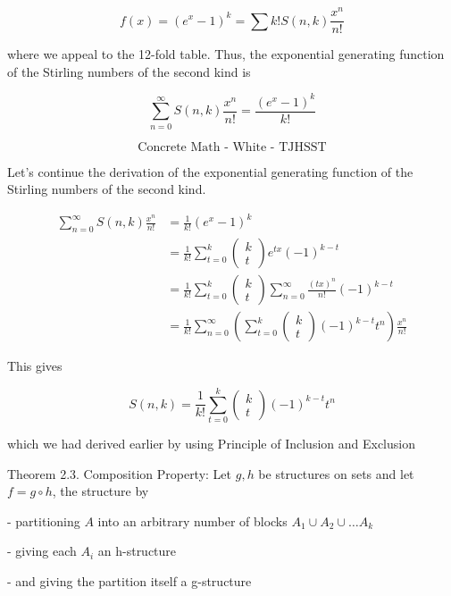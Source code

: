 $$
f(x)=\left(e^{x}-1\right)^{k}=\sum k ! S(n, k) \frac{x^{n}}{n !}
$$

where we appeal to the 12-fold table. Thus, the exponential generating function of the Stirling numbers of the second kind is

$$
\sum_{n=0}^{\infty} S(n, k) \frac{x^{n}}{n !}=\frac{\left(e^{x}-1\right)^{k}}{k !}
$$

$$
\text { Concrete Math - White - TJHSST }
$$

Let's continue the derivation of the exponential generating function of the Stirling numbers of the second kind.

$$
\begin{aligned}
\sum_{n=0}^{\infty} S(n, k) \frac{x^{n}}{n !} & =\frac{1}{k !}\left(e^{x}-1\right)^{k} \\
& =\frac{1}{k !} \sum_{t=0}^{k}\left(\begin{array}{l}
k \\
t
\end{array}\right) e^{t x}(-1)^{k-t} \\
& =\frac{1}{k !} \sum_{t=0}^{k}\left(\begin{array}{l}
k \\
t
\end{array}\right) \sum_{n=0}^{\infty} \frac{(t x)^{n}}{n !}(-1)^{k-t} \\
& =\frac{1}{k !} \sum_{n=0}^{\infty}\left(\sum_{t=0}^{k}\left(\begin{array}{l}
k \\
t
\end{array}\right)(-1)^{k-t} t^{n}\right) \frac{x^{n}}{n !}
\end{aligned}
$$

This gives

$$
S(n, k)=\frac{1}{k !} \sum_{t=0}^{k}\left(\begin{array}{l}
k \\
t
\end{array}\right)(-1)^{k-t} t^{n}
$$

which we had derived earlier by using Principle of Inclusion and Exclusion

Theorem 2.3. Composition Property: Let $g, h$ be structures on sets and let $f=g \circ h$, the structure by

- partitioning $A$ into an arbitrary number of blocks $A_{1} \cup A_{2} \cup \ldots A_{k}$

- giving each $A_{i}$ an h-structure

- and giving the partition itself a g-structure


